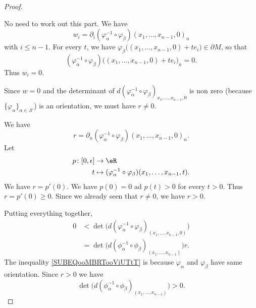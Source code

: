 \begin{proof}
\begin{subproof}
		\spitem[Part \( v\)]
		No need to work out this part.
		\spitem[Part \( w\)]
		We have
		\begin{equation}
			w_i=\partial_i(\varphi_{\alpha}^{-1}\circ\varphi_{\beta})(x_1,\ldots,x_{n-1}, 0)_n
		\end{equation}
		with \( i\leq n-1\). For every \( t\), we have \( \varphi_{\beta}\big( (x_1,\ldots,x_{n-1},0)+te_i \big)\in \partial M\), so that
		\begin{equation}
			( \varphi_{\alpha}^{-1} \circ\varphi_{\beta})\big( (x_1,\ldots,x_{n-1},0)+te_i \big)_n=0.
		\end{equation}
		Thus \( w_i=0\).

		\spitem[Part \( r\)]
		Since \( w=0\) and the determinant of \( d(\varphi_{\alpha}^{-1}\circ\varphi_{\beta})_{x_1,\ldots,x_{n-1},0} \) is non zero (because \( \{ \varphi_{\alpha} \}_{\alpha\in \Lambda'}\)) is an orientation, we must have \( r\neq 0\).

		We have
		\begin{equation}
			r=\partial_n(\varphi_{\alpha}^{-1}\circ\varphi_{\beta})(x_1,\ldots,x_{n-1}, 0)_n.
		\end{equation}
		Let
		\begin{equation}
			\begin{aligned}
				p\colon \mathopen[ 0,\epsilon\mathclose] & \to \eR                                                                    \\
				t                                        & \mapsto (\varphi_{\alpha}^{-1}\circ\varphi_{\beta})(x_1,\ldots,x_{n-1},t).
			\end{aligned}
		\end{equation}
		We have \( r=p'(0)\). We have \( p(0)=0\) ad \( p(t)>0\) for every \( t>0\). Thus \(  r=p'(0)\geq 0\). Since we already seen that \( r\neq 0\), we have \( r>0\).
	\end{subproof}
	Putting everything together,
	\begin{subequations}
		\begin{align}
			0 & < \det\big( d(\varphi_{\alpha}^{-1}\circ \varphi_{\beta})_{(x_1,\ldots,x_{n-1}, 0)} \big)			\label{SUBEQooMBRTooViUTtT} \\
			  & =\det\big( d(\phi_{\alpha}^{-1}\circ\phi_{\beta})_{(x_1,\ldots,x_{n-1})} \big)r.
		\end{align}
	\end{subequations}
	The inequality \eqref{SUBEQooMBRTooViUTtT} is because \( \varphi_{\alpha}\) and \( \varphi_{\beta}\) have same orientation. Since \( r>0 \) we have
	\begin{equation}
		\det\big( d(\phi_{\alpha}^{-1}\circ\phi_{\beta})_{(x_1,\ldots,x_{n-1})} \big)>0.
	\end{equation}
\end{proof}


